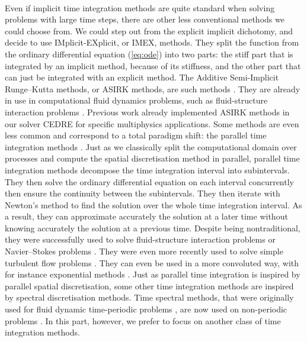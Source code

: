   \paragraph{}
  Even if implicit time integration methods are quite standard when solving problems with large time steps, there are other less conventional methods we could choose from.
  We could step out from the explicit implicit dichotomy, and decide to use IMplicit-EXplicit, or IMEX, methods.
  They split the function from the ordinary differential equation (\ref{eq:ode}) into two parts: the stiff part that is integrated by an implicit method, because of its stiffness, and the other part that can just be integrated with an explicit method.
  The Additive Semi-Implicit Runge--Kutta methods, or ASIRK methods, are such methods \cite{Zhong1996}.
  They are already in use in computational fluid dynamics problems, such as fluid-structure interaction problems \cite{HuangPerssonZahr2019}.
  Previous work already implemented ASIRK methods in our solver CEDRE for specific multiphysics applications.
  Some methods are even less common and correspond to a total paradigm shift: the parallel time integration methods \cite{Nievergelt1964, LionsMadayTurinici2001}.
  Just as we classically split the computational domain over processes and compute the spatial discretisation method in parallel, parallel time integration methods decompose the time integration interval into subintervals.
  They then solve the ordinary differential equation on each interval concurrently then ensure the continuity between the subintervals.
  They then iterate with Newton's method to find the solution over the whole time integration interval.
  As a result, they can approximate accurately the solution at a later time without knowing accurately the solution at a previous time.
  Despite being nontraditional, they were successfully used to solve fluid-structure interaction problems or Navier--Stokes problems \cite{GanderVandewalle2007}.
  They were even more recently used to solve simple turbulent flow problems \cite{Lunet2018}.
  They can even be used in a more convoluted way, with for instance exponential methods \cite{GanderGuettel2013}.
  Just as parallel time integration is inspired by parallel spatial discretisation, some other time integration methods are inspired by spectral discretisation methods.
  Time spectral methods, that were originally used for fluid dynamic time-periodic problems \cite{GopinathJameson2005, GopinathJameson2006}, are now used on non-periodic problems \cite{EkiciDjeddiLiEtAl2020}.
  In this part, however, we prefer to focus on another class of time integration methods.



